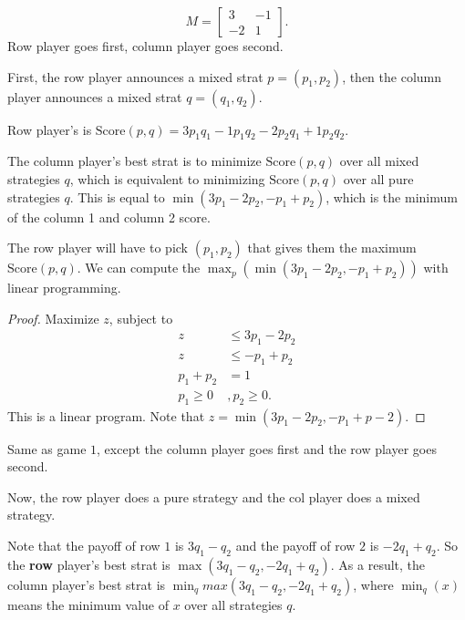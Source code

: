 \documentclass{article}
\begin{document}
\begin{ex}[Game 1]
    \[M = \begin{bmatrix}3 & -1 \\ -2 & 1 \end{bmatrix}.\] Row player goes first, column player goes second.
\end{ex}

First, the row player announces a mixed strat $p = (p_1, p_2)$, then the column player announces a mixed strat $q = (q_1, q_2)$.

\begin{defn}
    Row player's  is $\mathrm{Score}(p, q) = 3p_1q_1 - 1p_1q_2 -2p_2q_1 + 1p_2q_2$.
\end{defn}

The column player's best strat is to minimize $\mathrm{Score}(p, q)$ over all mixed strategies $q$, which is equivalent to minimizing $\mathrm{Score}(p, q)$ over all pure strategies $q$. This is equal to $\min(3p_1 - 2p_2, -p_1 + p_2)$, which is the minimum of the column 1 and column 2 score.

The row player will have to pick $(p_1, p_2)$ that gives them the maximum $\mathrm{Score}(p, q)$. We can compute the $\max_p(\min(3p_1 - 2p_2, -p_1 + p_2))$ with linear programming.

\begin{proof}
    Maximize $z$, subject to 
    \begin{align*}
        z &\leq 3p_1 - 2p_2 \\
        z &\leq -p_1 + p_2 \\
        p_1 + p_2 &= 1 \\
        p_1 \geq 0&, p_2 \geq 0.
    \end{align*}
    This is a linear program. Note that $z = \min(3p_1 - 2p_2, -p_1 + p-2)$.
\end{proof}

\begin{example}[Game 2]
    Same as game $1$, except the column player goes first and the row player goes second.
\end{example}

Now, the row player does a pure strategy and the col player does a mixed strategy.

Note that the payoff of row $1$ is $3q_1 - q_2$ and the payoff of row $2$ is $-2q_1 + q_2$. So the \textbf{row} player's best strat is $\max (3q_1 - q_2, -2q_1 + q_2)$. As a result, the column player's best strat is $\min_q max(3q_1 - q_2, -2q_1 + q_2)$, where $\min_q(x)$ means the minimum value of $x$ over all strategies $q$.
\end{document}
